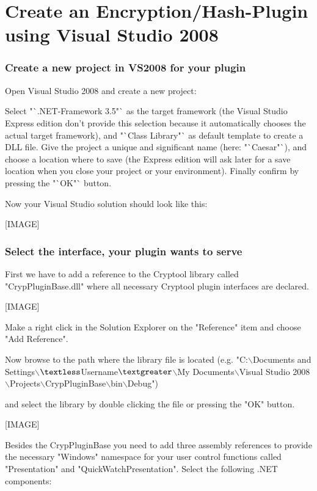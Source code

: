 \part{Create an Encryption/Hash-Plugin using Visual Studio 2008}

\section{Create a new project in VS2008 for your plugin}\label{sec:CreateANewProjectInVS2008ForYourPlugin}
Open Visual Studio 2008 and create a new project:



Select "`.NET-Framework 3.5"` as the target framework (the Visual Studio Express edition don't provide this selection because it automatically chooses the actual target framework), and "`Class Library"` as default template to create a DLL file. Give the project a unique and significant name (here: "`Caesar"`), and choose a location where to save (the Express edition will ask later for a save location when you close your project or your environment).  Finally confirm by pressing the "`OK"` button.




Now your Visual Studio solution should look like this:


[IMAGE]


\section{Select the interface, your plugin wants to serve}\label{sec:SelectTheInterfaceYourPluginWantsToServe}
First we have to add a reference to the Cryptool library called "CrypPluginBase.dll" where all necessary Cryptool plugin interfaces are declared.

[IMAGE]

Make a right click in the Solution Explorer on the "Reference" item and choose "Add Reference".

Now browse to the path where the library file is located (e.g. "C:$\backslash$Documents and Settings$\backslash$$\textless$Username$\textgreater$$\backslash$My Documents$\backslash$Visual Studio 2008$\backslash$Projects$\backslash$CrypPluginBase$\backslash$bin$\backslash$Debug") 

and select the library by double clicking the file or pressing the "OK" button.

[IMAGE]

Besides the CrypPluginBase you need to add three assembly references to provide the necessary "Windows" namespace for your user control functions called "Presentation" and "QuickWatchPresentation". Select the following .NET components:

